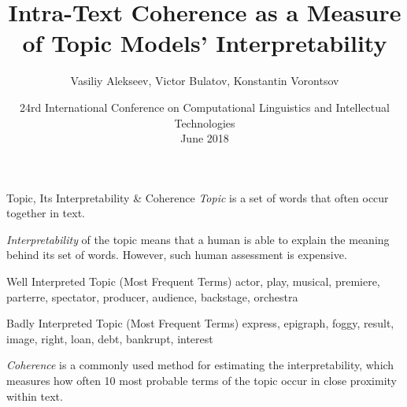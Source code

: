 \documentclass[russian]{beamer}
\title[Intra-Text Coherence]
{
  Intra-Text Coherence as a Measure of Topic Models’ Interpretability
}
\subtitle{}
\author[Vasiliy Alekseev]{
  Vasiliy Alekseev, %
  Victor Bulatov,
  Konstantin Vorontsov
}
\institute[]
{
  \footnotesize
}
\date[Dialogue 2018]
{
  \footnotesize
  {
    24rd International Conference on Computational Linguistics and Intellectual Technologies\\ \bigskip 1 June 2018
  }
}
\begin{document}

		

  
\frame{\titlepage}


\begin{frame}{Topic, Its Interpretability \& Coherence}
  \emph{Topic} is a set of words that often occur together in text.
  
  \medskip
  
  \emph{Interpretability} of the topic means that a human is able to explain the meaning behind its set of words.
  However, such human assessment is expensive.
  
  \vspace{0.25cm}
  
  \begin{exampleblock}{Well Interpreted Topic (Most Frequent Terms)}
    actor, play, musical, premiere, parterre, spectator, producer, audience, backstage, orchestra
  \end{exampleblock}
  
  \begin{alertblock}{Badly Interpreted Topic (Most Frequent Terms)}
    express, epigraph, foggy, result, image, right, 
    loan, debt, bankrupt, interest
  \end{alertblock}
  
  \vspace{0.25cm}
  
  \emph{Coherence} is a commonly used method for estimating the interpretability, which measures how often 10 most probable terms of the topic occur in close proximity within text.
\end{frame}
\end{document}
